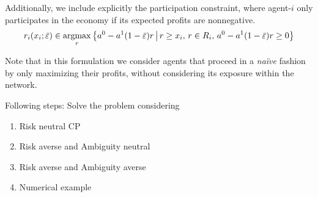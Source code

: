 Additionally, we include explicitly the participation constraint, where agent-$i$ only participates in the economy if its expected profits are nonnegative.  
\[r_i(x_i;\bar {\varepsilon})\in\mathop{\rm argmax}_r\big\lbrace a^0-a^1(1-\bar{\varepsilon})r{\,\big\vert\,} r\geq x_i,\,r\in R_i,\,a^0-a^1(1-\bar{\varepsilon})r\geq 0\big\rbrace\]

Note that in this formulation we consider agents that proceed in a \emph{na\"ive} fashion by only maximizing their profits, without considering its exposure within the network.

Following steps: Solve the problem considering
\begin{enumerate}
\item Risk neutral CP
\item Risk averse and Ambiguity neutral
\item Risk averse and Ambiguity averse
\item Numerical example
\end{enumerate}

